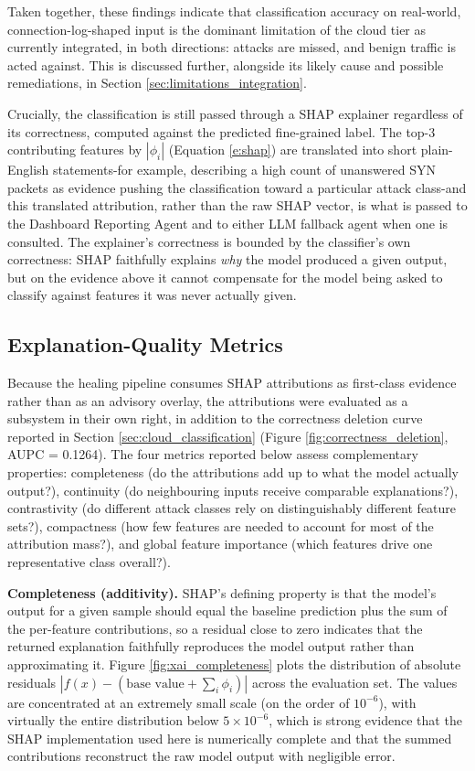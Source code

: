 Taken together, these findings indicate that classification accuracy on real-world, connection-log-shaped input is the dominant limitation of the cloud tier as currently integrated, in both directions: attacks are missed, and benign traffic is acted against. This is discussed further, alongside its likely cause and possible remediations, in Section \ref{sec:limitations_integration}.

Crucially, the classification is still passed through a SHAP explainer regardless of its correctness, computed against the predicted fine-grained label. The top-3 contributing features by $|\phi_i|$ (Equation \ref{e:shap}) are translated into short plain-English statements-for example, describing a high count of unanswered SYN packets as evidence pushing the classification toward a particular attack class-and this translated attribution, rather than the raw SHAP vector, is what is passed to the Dashboard Reporting Agent and to either LLM fallback agent when one is consulted. The explainer's correctness is bounded by the classifier's own correctness: SHAP faithfully explains \textit{why} the model produced a given output, but on the evidence above it cannot compensate for the model being asked to classify against features it was never actually given.

\subsection{Explanation-Quality Metrics}\label{sec:xai_eval}

Because the healing pipeline consumes SHAP attributions as first-class evidence rather than as an advisory overlay, the attributions were evaluated as a subsystem in their own right, in addition to the correctness deletion curve reported in Section \ref{sec:cloud_classification} (Figure \ref{fig:correctness_deletion}, AUPC = 0.1264). The four metrics reported below assess complementary properties: completeness (do the attributions add up to what the model actually output?), continuity (do neighbouring inputs receive comparable explanations?), contrastivity (do different attack classes rely on distinguishably different feature sets?), compactness (how few features are needed to account for most of the attribution mass?), and global feature importance (which features drive one representative class overall?).

\textbf{Completeness (additivity).} SHAP's defining property is that the model's output for a given sample should equal the baseline prediction plus the sum of the per-feature contributions, so a residual close to zero indicates that the returned explanation faithfully reproduces the model output rather than approximating it. Figure \ref{fig:xai_completeness} plots the distribution of absolute residuals $|f(x) - (\text{base value} + \sum_i \phi_i)|$ across the evaluation set. The values are concentrated at an extremely small scale (on the order of $10^{-6}$), with virtually the entire distribution below $5 \times 10^{-6}$, which is strong evidence that the SHAP implementation used here is numerically complete and that the summed contributions reconstruct the raw model output with negligible error.

